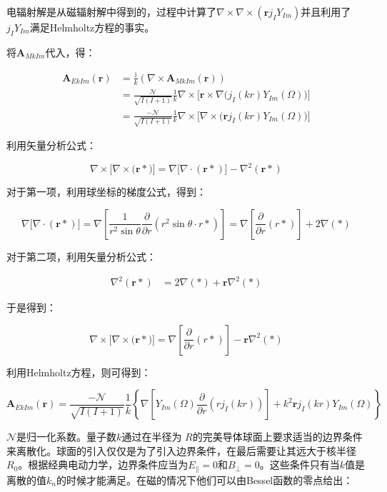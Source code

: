 电辐射解是从磁辐射解中得到的，过程中计算了$\nabla\times\nabla\times(\boldsymbol{r}j_{I}Y_{Im})$并且利用了$j_{I}Y_{Im}$满足Helmholtz方程的事实。
\begin{booknote*}
将$\boldsymbol{A}_{MkIm}$代入，得：

\begin{align*}
\boldsymbol{A}_{EkIm}(\boldsymbol{r}) & =\frac{\mathrm{i}}{k}(\nabla\times\boldsymbol{A}_{MkIm}(\boldsymbol{r}))\\
 & =\frac{\mathcal{N}}{\sqrt{I(I+1)}}\frac{1}{k}\nabla\times\bigl[\boldsymbol{r}\times\nabla\bigl(j_{I}(kr)Y_{Im}(\Omega)\bigr)\bigr]\\
 & =\frac{-\mathcal{N}}{\sqrt{I(I+1)}}\frac{1}{k}\nabla\times\bigl[\nabla\times\bigl(\boldsymbol{r}j_{I}(kr)Y_{Im}(\Omega)\bigr)\bigr]
\end{align*}

利用矢量分析公式：

\[
\nabla\times\bigl[\nabla\times\bigl(\boldsymbol{r}*\bigr)\bigr]=\nabla\bigl[\nabla\cdot(\boldsymbol{r}*)\bigr]-\nabla^{2}(\boldsymbol{r}*)
\]

对于第一项，利用球坐标的梯度公式，得到：

\[
\nabla\bigl[\nabla\cdot(\boldsymbol{r}*)\bigr]=\nabla\left[\frac{1}{r^{2}\sin\theta}\frac{\partial}{\partial r}(r^{2}\sin\theta\cdot r*)\right]=\nabla\left[\frac{\partial}{\partial r}(r*)\right]+2\nabla(*)
\]

对于第二项，利用矢量分析公式：

\begin{align*}
\nabla^{2}(\boldsymbol{r}*) & =2\nabla(*)+\boldsymbol{r}\nabla^{2}(*)
\end{align*}

于是得到：

\[
\nabla\times\bigl[\nabla\times\bigl(\boldsymbol{r}*\bigr)\bigr]=\nabla\left[\frac{\partial}{\partial r}(r*)\right]-\boldsymbol{r}\nabla^{2}(*)
\]

利用Helmholtz方程，则可得到：

\[
\boldsymbol{A}_{EkIm}(\boldsymbol{r})=\frac{-\mathcal{N}}{\sqrt{I(I+1)}}\frac{1}{k}\left\{ \nabla\left[Y_{Im}(\Omega)\frac{\partial}{\partial r}(rj_{I}(kr))\right]+k^{2}\boldsymbol{r}j_{I}(kr)Y_{Im}(\Omega)\right\} 
\]
\end{booknote*}
$\mathcal{N}$是归一化系数。量子数$k$通过在半径为 $R$的完美导体球面上要求适当的边界条件来离散化。球面的引入仅仅是为了引入边界条件，在最后需要让其远大于核半径$R_{0}$。根据经典电动力学，边界条件应当为$E_{\parallel}=0$和$B_{\perp}=0$。这些条件只有当$k$值是离散的值$k_{n}$的时候才能满足。在磁的情况下他们可以由Bessel函数的零点给出：

